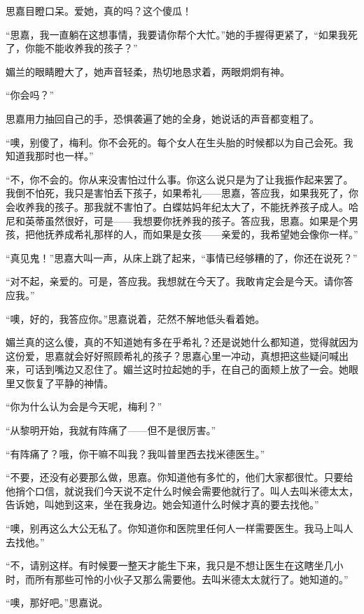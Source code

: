 \par 思嘉目瞪口呆。爱她，真的吗？这个傻瓜！
\par “思嘉，我一直躺在这想事情，我要请你帮个大忙。”她的手握得更紧了，“如果我死了，你能不能收养我的孩子？”
\par 媚兰的眼睛瞪大了，她声音轻柔，热切地恳求着，两眼炯炯有神。
\par “你会吗？”
\par 思嘉用力抽回自己的手，恐惧袭遍了她的全身，她说话的声音都变粗了。
\par “噢，别傻了，梅利。你不会死的。每个女人在生头胎的时候都以为自己会死。我知道我那时也一样。”
\par “不，你不会的。你从来没害怕过什么事。你这么说只是为了让我振作起来罢了。我倒不怕死，我只是害怕丢下孩子，如果希礼——思嘉，答应我，如果我死了，你会收养我的孩子。那我就不害怕了。白蝶姑妈年纪太大了，不能抚养孩子成人。哈尼和英蒂虽然很好，可是——我想要你抚养我的孩子。答应我，思嘉。如果是个男孩，把他抚养成希礼那样的人，而如果是女孩——亲爱的，我希望她会像你一样。”
\par “真见鬼！”思嘉大叫一声，从床上跳了起来，“事情已经够糟的了，你还在说死？”
\par “对不起，亲爱的。可是，答应我。我想就在今天了。我敢肯定会是今天。请你答应我。”
\par “噢，好的，我答应你。”思嘉说着，茫然不解地低头看着她。
\par 媚兰真的这么傻，真的不知道她有多在乎希礼？还是说她什么都知道，觉得就因为这份爱，思嘉就会好好照顾希礼的孩子？思嘉心里一冲动，真想把这些疑问喊出来，可话到嘴边又忍住了。媚兰这时拉起她的手，在自己的面颊上放了一会。她眼里又恢复了平静的神情。
\par “你为什么认为会是今天呢，梅利？”
\par “从黎明开始，我就有阵痛了——但不是很厉害。”
\par “有阵痛了？哦，你干嘛不叫我？我叫普里西去找米德医生。”
\par “不要，还没有必要那么做，思嘉。你知道他有多忙的，他们大家都很忙。只要给他捎个口信，就说我们今天说不定什么时候会需要他就行了。叫人去叫米德太太，告诉她，叫她到这来，坐在我身边。她会知道什么时候才真的要去找他。”
\par “噢，别再这么大公无私了。你知道你和医院里任何人一样需要医生。我马上叫人去找他。”
\par “不，请别这样。有时候要一整天才能生下来，我只是不想让医生在这瞎坐几小时，而所有那些可怜的小伙子又那么需要他。去叫米德太太就行了。她知道的。”
\par “噢，那好吧。”思嘉说。


